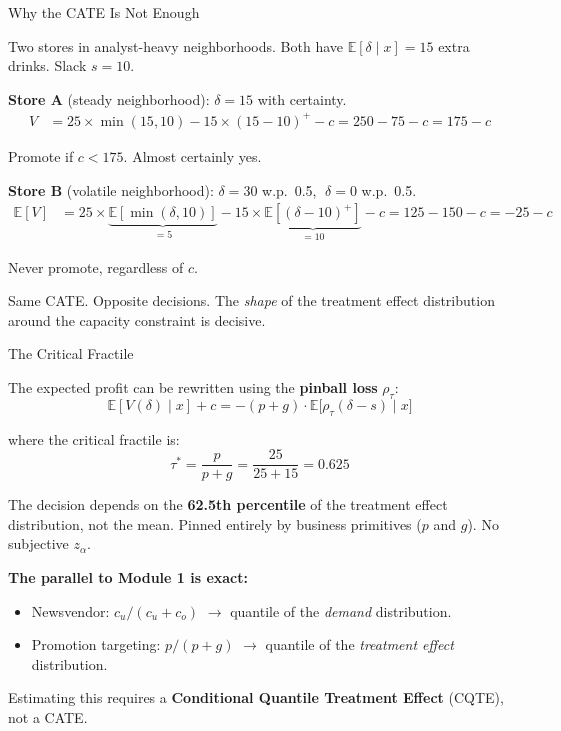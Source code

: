 \documentclass[aspectratio=169, 11pt, handout]{beamer}
\newcommand{\E}{\mathbb{E}}
\begin{document}
 
\begin{frame}{Why the CATE Is Not Enough}
 
Two stores in analyst-heavy neighborhoods. Both have $\E[\delta \mid x] = 15$ extra drinks. Slack $s = 10$.
 
\bigskip
 
\textbf{Store A} (steady neighborhood): $\delta = 15$ with certainty.
\begin{align*}
V &= 25 \times \min(15, 10) - 15 \times (15 - 10)^+ - c = 250 - 75 - c = 175 - c
\end{align*}
 
Promote if $c < 175$. \textcolor{sbgreen}{Almost certainly yes.}
 
\pause
\bigskip
 
\textbf{Store B} (volatile neighborhood): $\delta = 30$ w.p.\ 0.5, $\;\delta = 0$ w.p.\ 0.5.
\begin{align*}
\E[V] &= 25 \times \underbrace{\E[\min(\delta, 10)]}_{=5} - 15 \times \underbrace{\E[(\delta - 10)^+]}_{=10} - c = 125 - 150 - c = -25 - c
\end{align*}
 
\textcolor{warnred}{Never promote}, regardless of $c$.
 
\pause
\bigskip
 
Same CATE. Opposite decisions. The \emph{shape} of the treatment effect distribution around the capacity constraint is decisive.
 
\end{frame}
 
 
\begin{frame}{The Critical Fractile}
 
The expected profit can be rewritten using the \textbf{pinball loss} $\rho_\tau$:
\[
\E[V(\delta) \mid x] + c = -(p + g) \cdot \E\bigl[\rho_\tau(\delta - s) \mid x\bigr]
\]
 
where the critical fractile is:
\[
\tau^* = \frac{p}{p + g} = \frac{25}{25 + 15} = 0.625
\]
 
\pause
\bigskip
 
The decision depends on the \textbf{62.5th percentile} of the treatment effect distribution, not the mean. Pinned entirely by business primitives ($p$ and $g$). No subjective $z_\alpha$.
 
\pause
\bigskip
 
\textbf{The parallel to Module 1 is exact:}
\begin{itemize}
    \item Newsvendor: $c_u/(c_u + c_o)$ $\to$ quantile of the \emph{demand} distribution.
    \item Promotion targeting: $p/(p + g)$ $\to$ quantile of the \emph{treatment effect} distribution.
\end{itemize}
 
\medskip
 
Estimating this requires a \textbf{Conditional Quantile Treatment Effect} (CQTE), not a CATE.
 
\end{frame}
 
\end{document}
